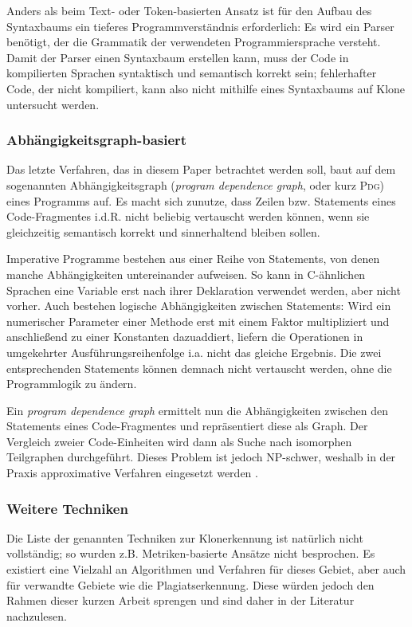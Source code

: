 Anders als beim Text- oder Token-basierten Ansatz ist für den Aufbau des Syntaxbaums ein tieferes Programmverständnis erforderlich: Es wird ein Parser benötigt, der die Grammatik der verwendeten Programmiersprache versteht. Damit der Parser einen Syntaxbaum erstellen kann, muss der Code in kompilierten Sprachen syntaktisch und semantisch korrekt sein; fehlerhafter Code, der nicht kompiliert, kann also nicht mithilfe eines Syntaxbaums auf Klone untersucht werden.


\subsubsection{Abhängigkeitsgraph-basiert}

Das letzte Verfahren, das in diesem Paper betrachtet werden soll, baut auf dem sogenannten Abhängigkeitsgraph  (\textit{program dependence graph}, oder kurz \textsc{Pdg}) eines Programms auf. Es macht sich zunutze, dass Zeilen bzw. Statements eines Code-Fragmentes i.d.R. nicht beliebig vertauscht werden können, wenn sie gleichzeitig semantisch korrekt und sinnerhaltend bleiben sollen.

Imperative Programme bestehen aus einer Reihe von Statements, von denen manche Abhängigkeiten untereinander aufweisen. So kann in C-ähnlichen Sprachen eine Variable erst nach ihrer Deklaration verwendet werden, aber nicht vorher. Auch bestehen logische Abhängigkeiten zwischen Statements: Wird ein numerischer Parameter einer Methode erst mit einem Faktor multipliziert und anschließend zu einer Konstanten dazuaddiert, liefern die Operationen in umgekehrter Ausführungsreihenfolge i.a. nicht das gleiche Ergebnis. Die zwei entsprechenden Statements können demnach nicht vertauscht werden, ohne die Programmlogik zu ändern.

Ein \textit{program dependence graph} ermittelt nun die Abhängigkeiten zwischen den Statements eines Code-Fragmentes und repräsentiert diese als Graph. Der Vergleich zweier Code-Einheiten wird dann als Suche nach isomorphen Teilgraphen durchgeführt. Dieses Problem ist jedoch NP-schwer, weshalb in der Praxis approximative Verfahren eingesetzt werden \cite{koschke2007survey}.


\subsubsection{Weitere Techniken}

Die Liste der genannten Techniken zur Klonerkennung ist natürlich nicht vollständig; so wurden z.B. Metriken-basierte Ansätze nicht besprochen. Es existiert eine Vielzahl an Algorithmen und Verfahren für dieses Gebiet, aber auch für verwandte Gebiete wie die Plagiatserkennung. Diese würden jedoch den Rahmen dieser kurzen Arbeit sprengen und sind daher in der Literatur nachzulesen.
